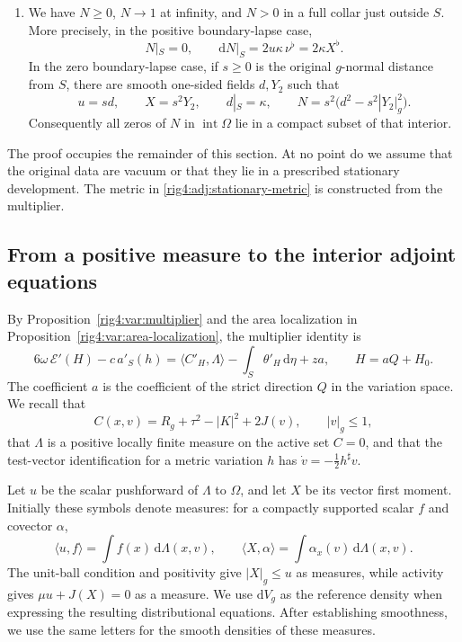 \begin{theorem}
\begin{enumerate}[label=\textup{(\roman*)}]
\item We have $N\ge0$, $N\to1$ at infinity, and $N>0$ in a full collar just
outside $S$.  More precisely, in the positive boundary-lapse case,
\begin{equation}
 N|_S=0,\qquad
 \mathrm dN|_S=2u\kappa\,\nu^\flat=2\kappa X^\flat.
 \label{rig4:adj:positive-collar}
\end{equation}
In the zero boundary-lapse case, if $s\ge0$ is the original $g$-normal distance
from $S$, there are smooth one-sided fields $d,Y_2$ such that
\begin{equation}
 u=sd,\qquad X=s^2Y_2,\qquad d|_S=\kappa,\qquad
 N=s^2\bigl(d^2-s^2|Y_2|_g^2\bigr).
 \label{rig4:adj:zero-collar}
\end{equation}
Consequently all zeros of $N$ in $\operatorname{int}\Omega$ lie in a compact
subset of that interior.
\end{enumerate}
\end{theorem}

The proof occupies the remainder of this section.  At no point do we assume
that the original data are vacuum or that they lie in a prescribed stationary
development.  The metric in \eqref{rig4:adj:stationary-metric} is constructed from
the multiplier.

\subsection{From a positive measure to the interior adjoint equations}
\label{rig4:adj:measures}

By Proposition~\ref{rig4:var:multiplier} and the area localization in
Proposition~\ref{rig4:var:area-localization}, the multiplier identity is
\begin{equation}
 6\omega\,\mathcal E'(H)-c\,a'_S(h)
 =\langle C'_H,\Lambda\rangle
   -\int_S\theta'_H\,\mathrm d\eta+za,
 \qquad H=aQ+H_0.
 \label{rig4:adj:localized-multiplier}
\end{equation}
The coefficient $a$ is the coefficient of the strict direction $Q$ in the
variation space.  We recall that
\[
 C(x,v)=R_g+\tau^2-|K|^2+2J(v),\qquad |v|_g\le1,
\]
that $\Lambda$ is a positive locally finite measure on the active set $C=0$,
and that the test-vector identification for a metric variation $h$ has
$\dot v=-\tfrac12h^\sharp v$.

Let $u$ be the scalar pushforward of $\Lambda$ to $\Omega$, and let $X$ be its
vector first moment.  Initially these symbols denote measures: for a compactly
supported scalar $f$ and covector $\alpha$,
\[
 \langle u,f\rangle=\int f(x)\,\mathrm d\Lambda(x,v),
 \qquad
 \langle X,\alpha\rangle=\int\alpha_x(v)\,\mathrm d\Lambda(x,v).
\]
The unit-ball condition and positivity give $|X|_g\le u$ as measures, while
activity gives $\mu u+J(X)=0$ as a measure.  We use $\mathrm dV_g$ as the
reference density when expressing the resulting distributional equations.
After establishing smoothness, we use the same letters for the smooth
densities of these measures.

